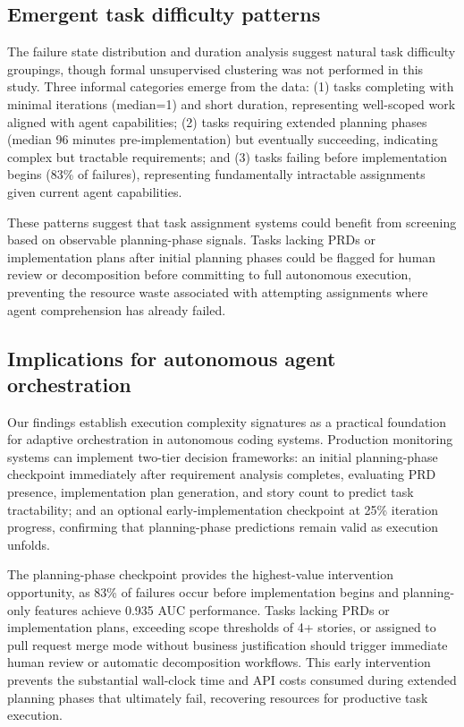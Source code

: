 \documentclass[]{article}
\begin{document}
\subsection{Emergent task difficulty patterns}

The failure state distribution and duration analysis suggest natural task difficulty groupings, though formal unsupervised clustering was not performed in this study. Three informal categories emerge from the data: (1) tasks completing with minimal iterations (median=1) and short duration, representing well-scoped work aligned with agent capabilities; (2) tasks requiring extended planning phases (median 96 minutes pre-implementation) but eventually succeeding, indicating complex but tractable requirements; and (3) tasks failing before implementation begins (83\% of failures), representing fundamentally intractable assignments given current agent capabilities.

These patterns suggest that task assignment systems could benefit from screening based on observable planning-phase signals. Tasks lacking PRDs or implementation plans after initial planning phases could be flagged for human review or decomposition before committing to full autonomous execution, preventing the resource waste associated with attempting assignments where agent comprehension has already failed.

\subsection{Implications for autonomous agent orchestration}

Our findings establish execution complexity signatures as a practical foundation for adaptive orchestration in autonomous coding systems. Production monitoring systems can implement two-tier decision frameworks: an initial planning-phase checkpoint immediately after requirement analysis completes, evaluating PRD presence, implementation plan generation, and story count to predict task tractability; and an optional early-implementation checkpoint at 25\% iteration progress, confirming that planning-phase predictions remain valid as execution unfolds.

The planning-phase checkpoint provides the highest-value intervention opportunity, as 83\% of failures occur before implementation begins and planning-only features achieve 0.935 AUC performance. Tasks lacking PRDs or implementation plans, exceeding scope thresholds of 4+ stories, or assigned to pull request merge mode without business justification should trigger immediate human review or automatic decomposition workflows. This early intervention prevents the substantial wall-clock time and API costs consumed during extended planning phases that ultimately fail, recovering resources for productive task execution.
\end{document}
